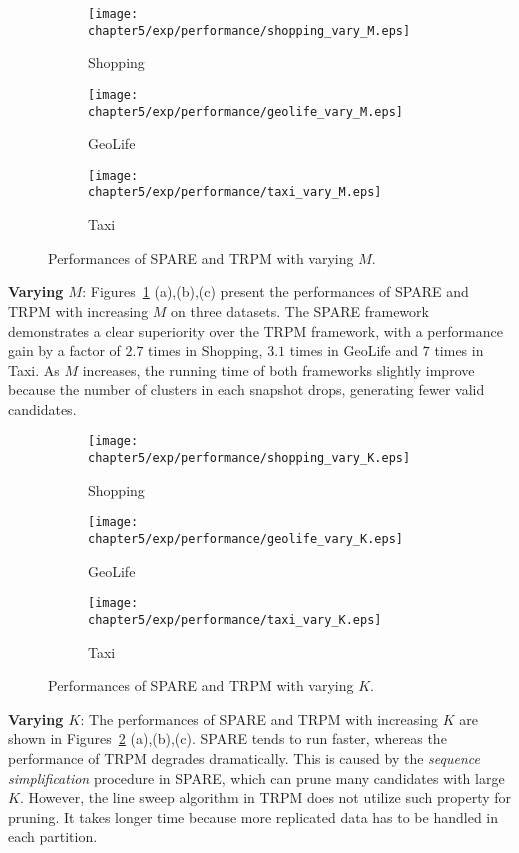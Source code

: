 \begin{figure}[h]
\centering
 \begin{subfigure}[b]{0.3\textwidth}
        \texttt{[image: chapter5/exp/performance/shopping\_vary\_M.eps]}
	     \caption{Shopping}	
 \end{subfigure}
 \begin{subfigure}[b]{0.3\textwidth}
        \texttt{[image: chapter5/exp/performance/geolife\_vary\_M.eps]}
        \caption{GeoLife}
    \end{subfigure}
 \begin{subfigure}[b]{0.3\textwidth}
      \texttt{[image: chapter5/exp/performance/taxi\_vary\_M.eps]}
      \caption{Taxi}
 \end{subfigure}
\caption{Performances of SPARE and TRPM with varying $M$.}
\label{exp:performance_vary_m}
\end{figure}

\textbf{Varying $M$}: Figures~\ref{exp:performance_vary_m} (a),(b),(c)
present the performances of SPARE and TRPM with increasing $M$ on three datasets. The SPARE framework demonstrates a clear superiority over the TRPM framework, with 
a performance gain by a factor of  $2.7$ times in Shopping, $3.1$ times in GeoLife and
$7$ times in Taxi. As $M$ increases, the running time of both frameworks slightly improve because the number of clusters in each snapshot drops, generating fewer valid candidates.

\begin{figure}[h]
\centering
 \begin{subfigure}[b]{0.3\textwidth}
        \texttt{[image: chapter5/exp/performance/shopping\_vary\_K.eps]}
	     \caption{Shopping}	
 \end{subfigure}
 \begin{subfigure}[b]{0.3\textwidth}
        \texttt{[image: chapter5/exp/performance/geolife\_vary\_K.eps]}
        \caption{GeoLife}
    \end{subfigure}
 \begin{subfigure}[b]{0.3\textwidth}
      \texttt{[image: chapter5/exp/performance/taxi\_vary\_K.eps]}
      \caption{Taxi}
 \end{subfigure}
\caption{Performances of SPARE and TRPM with varying $K$.}
\label{exp:performance_vary_k}
\end{figure}

\textbf{Varying $K$}: The performances of SPARE and TRPM with increasing $K$ are shown in Figures~\ref{exp:performance_vary_k} (a),(b),(c).  SPARE tends to run faster, whereas the performance of TRPM degrades dramatically. This is caused by the \emph{sequence simplification} procedure in SPARE, which can prune many candidates with large $K$. However, the line sweep algorithm in TRPM does not utilize such property for pruning. It takes longer time because more replicated data has to be handled in each partition.

